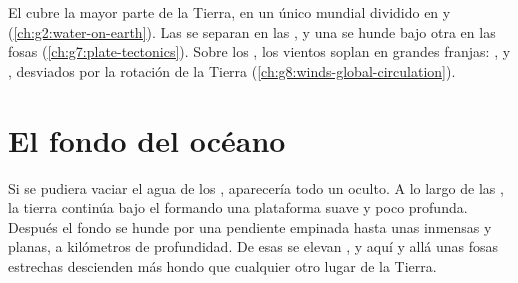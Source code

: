 \begin{recall}
El  cubre la mayor parte de la Tierra, en un único 
mundial dividido en  y  (\cref{ch:g2:water-on-earth}). Las
 se separan en las , y una  se hunde bajo otra
en las fosas (\cref{ch:g7:plate-tectonics}). Sobre los , los vientos
soplan en grandes franjas: ,  y , desviados por la rotación de la Tierra
(\cref{ch:g8:winds-global-circulation}).
\end{recall}

\section{El fondo del océano}

Si se pudiera vaciar el agua de los , aparecería todo un 
oculto. A lo largo de las , la tierra continúa bajo el  formando
una plataforma suave y poco profunda. Después el fondo se hunde por una
pendiente empinada hasta unas  inmensas y planas, a kilómetros de
profundidad. De esas  se elevan , y aquí y allá unas
fosas estrechas descienden más hondo que cualquier otro lugar de la Tierra.

